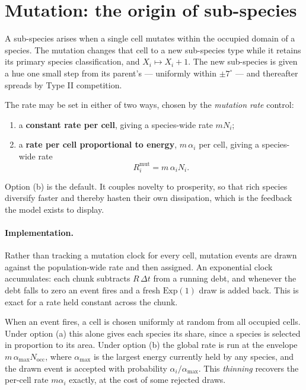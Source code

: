 \documentclass[11pt,a4paper]{article}
\newcommand{\dt}{\Delta t}
\begin{document}
\section{Mutation: the origin of sub-species}
\label{sec:mutation}

A sub-species arises when a single cell mutates within the occupied domain of a species.
The mutation changes that cell to a new sub-species type while it retains its primary
species classification, and $X_i \mapsto X_i + 1$. The new sub-species is given a hue one
small step from its parent's --- uniformly within $\pm 7^{\circ}$ --- and thereafter
spreads by Type II competition.

The rate may be set in either of two ways, chosen by the \emph{mutation rate} control:
\begin{enumerate}[label=(\alph*),itemsep=2pt]
  \item a \textbf{constant rate per cell}, giving a species-wide rate $m N_i$;
  \item a \textbf{rate per cell proportional to energy}, $m\,\alpha_i$ per cell, giving a
        species-wide rate
        \begin{equation}
          R^{\text{mut}}_i = m\,\alpha_i N_i .
        \end{equation}
\end{enumerate}
Option (b) is the default. It couples novelty to prosperity, so that rich species
diversify faster and thereby hasten their own dissipation, which is the feedback the
model exists to display.

\paragraph{Implementation.} Rather than tracking a mutation clock for every cell,
mutation events are drawn against the population-wide rate and then assigned. An
exponential clock accumulates: each chunk subtracts $R\,\dt$ from a running debt, and
whenever the debt falls to zero an event fires and a fresh $\mathrm{Exp}(1)$ draw is added
back. This is exact for a rate held constant across the chunk.

When an event fires, a cell is chosen uniformly at random from all occupied cells. Under
option (a) this alone gives each species its share, since a species is selected in
proportion to its area. Under option (b) the global rate is run at the envelope
$m\,\alpha_{\max} N_{\text{occ}}$, where $\alpha_{\max}$ is the largest energy currently
held by any species, and the drawn event is accepted with probability
$\alpha_i / \alpha_{\max}$. This \emph{thinning} recovers the per-cell rate $m\alpha_i$
exactly, at the cost of some rejected draws.
\end{document}
